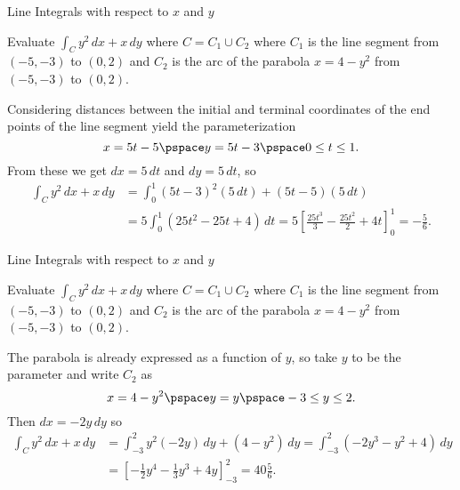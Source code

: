 \documentclass[11pt,english,
handout
]{beamer}
\begin{document}
\begin{frame}[t]{Line Integrals with respect to $x$ and $y$}
\small 
\begin{example}
Evaluate $\displaystyle \int_Cy^2\,dx+x\,dy$ where $C=C_1\cup C_2$ where $C_1$ is the line segment from $(-5,-3)$ to $(0,2)$ and $C_2$ is the arc of the parabola $x=4-y^2$ from $(-5,-3)$ to $(0,2)$.

\lspace
Considering distances between the initial and terminal coordinates of the end points of the line segment yield the parameterization 
\[
x=5t-5\pspace y=5t-3\pspace 0\leq t\leq 1.
\]\pause
From these we get $dx=5\,dt$ and $dy=5\,dt$, so
\begin{align*}
\int_Cy^2\,dx+x\,dy&=\int_0^1 (5t-3)^2(5\,dt)+(5t-5)(5\,dt)\\[2mm]
&=5\int_0^1(25t^2-25t+4)\,dt=5\left[\frac{25t^3}{3}-\frac{25t^2}{2}+4t\right]_0^1=-\frac{5}{6}.
\end{align*}
\end{example}
\end{frame}








\begin{frame}[t]{Line Integrals with respect to $x$ and $y$}
\small 
\begin{example}
Evaluate $\displaystyle \int_Cy^2\,dx+x\,dy$ where $C=C_1\cup C_2$ where $C_1$ is the line segment from $(-5,-3)$ to $(0,2)$ and $C_2$ is the arc of the parabola $x=4-y^2$ from $(-5,-3)$ to $(0,2)$.

\lspace
The parabola is already expressed as a function of $y$, so take $y$ to be the parameter and write $C_2$ as
\[
x=4-y^2\pspace y=y\pspace -3\leq y\leq 2.
\]\pause 
Then $dx=-2y\,dy$ so
\begin{align*}
\int_Cy^2\,dx+x\,dy&=\int_{-3}^2y^2(-2y)\,dy+(4-y^2)\,dy=\int_{-3}^2(-2y^3-y^2+4)\,dy\\[2mm]
&=\left[-\frac{1}{2}y^4-\frac{1}{3}y^3+4y\right]_{-3}^2=40\frac{5}{6}.
\end{align*}
\end{example}
\end{frame}
\end{document}
